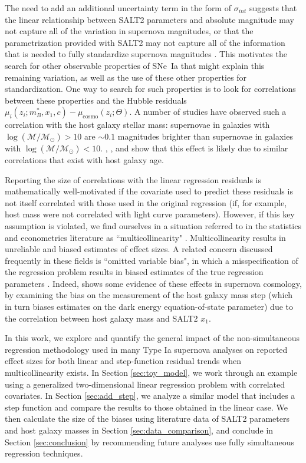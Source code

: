 The need to add an additional uncertainty term in the form of $\sigma_{int}$ suggests that the linear relationship between SALT2 parameters and absolute magnitude may not capture all of the variation in supernova magnitudes, or that the parametrization provided with SALT2 may not capture all of the information that is needed to fully standardize supernova magnitudes \citep{saunders_snemo_2018}. This motivates the search for other observable properties of SNe~Ia that might explain this remaining variation, as well as the use of these other properties for standardization. One way to search for such properties is to look for correlations between these properties and the Hubble residuals $\mu_i(z_i;m_B^*, x_1, c)-\mu_\text{cosmo}(z_i;\Theta)$. A number of studies \citep{kelly_hubble_2010, lampeitl_effect_2010, sullivan_dependence_2010, childress_host_2013} have observed such a correlation with the host galaxy stellar mass: supernovae in galaxies with $\log(\mathcal{M}/\mathcal{M}_\odot) > 10$ are $\sim0.1$ magnitudes brighter than supernovae in galaxies with $\log(\mathcal{M}/\mathcal{M}_\odot) < 10$. \cite{rigault_evidence_2013}, \cite{childress_ages_2014}, and  \cite{rigault_confirmation_2015} show that this effect is likely due to similar correlations that exist with host galaxy age.

Reporting the size of correlations with the linear regression residuals is mathematically well-motivated if the covariate used to predict these residuals is not itself correlated with those used in the original regression (if, for example, host mass were not correlated with light curve parameters). However, if this key assumption is violated, we find ourselves in a situation referred to in the statistics and econometrics literature as ``multicollinearity" \cite[e.g.][]{farrar_multicollinearity_1967}. Multicollinearity results in unreliable and biased estimates of effect sizes.  A related concern discussed frequently  in these fields is ``omitted variable bias", in which a misspecification of the regression problem results in biased estimates of the true regression parameters \citep{clarke_phantom_2005, wooldridge_introductory_2013}. Indeed, \cite{smith_first_2020} shows some evidence of these effects in supernova cosmology, by  examining the bias on the measurement of the host galaxy mass step (which in turn biases estimates on the dark energy equation-of-state parameter) due to the correlation between host galaxy mass and SALT2 $x_1$.

In this work, we explore and quantify the general impact of the non-simultaneous regression methodology used in many Type Ia supernova analyses on reported effect sizes for both linear and step-function residual trends when multicollinearity exists. In Section \ref{sec:toy_model}, we work through an example using a generalized two-dimensional linear regression problem with correlated covariates. In Section \ref{sec:add_step}, we analyze a similar model that includes a step function and compare the results to those obtained in the linear case. We then calculate the size of the biases using literature data of SALT2 parameters and host galaxy masses in Section \ref{sec:data_comparison}, and conclude in Section \ref{sec:conclusion} by recommending future analyses use fully simultaneous regression techniques.


